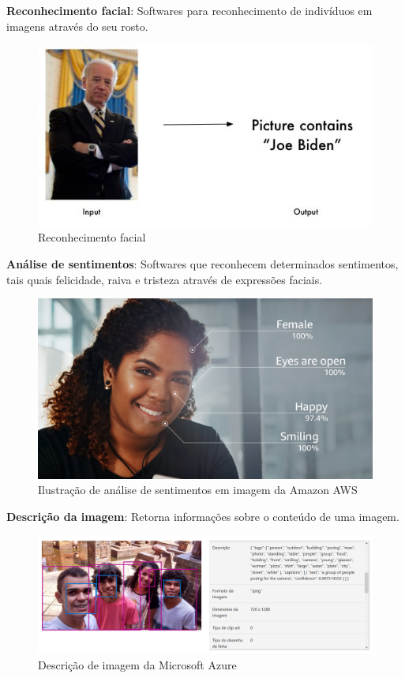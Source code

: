 \documentclass{article}
\begin{document}
\textbf{Reconhecimento facial}: Softwares para reconhecimento de indivíduos em imagens através do seu rosto.\\
\begin{figure}[H]
    \centering
    \includegraphics[scale=0.5]{imagens/reconhecimento_facial.jpg}
    \caption{Reconhecimento facial}
    \label{fig:reconhecimento_facial}
\end{figure}{}
\textbf{Análise de sentimentos}: Softwares que reconhecem determinados sentimentos, tais quais felicidade, raiva e tristeza através de expressões faciais.\\
\begin{figure}[H]
    \centering
    \includegraphics[scale=0.19]{imagens/analise_facial.jpg}
    \caption{Ilustração de análise de sentimentos em imagem da Amazon AWS}
    \label{fig:imagem_sentimentos}
\end{figure}{}
\textbf{Descrição da imagem}: Retorna informações sobre o conteúdo de uma imagem.\\
\begin{figure}[H]
    \centering
    \includegraphics[scale=0.25]{imagens/caption.png}
    \caption{Descrição de imagem da Microsoft Azure}
    \label{fig:captionalize}
\end{figure}{}
\end{document}
